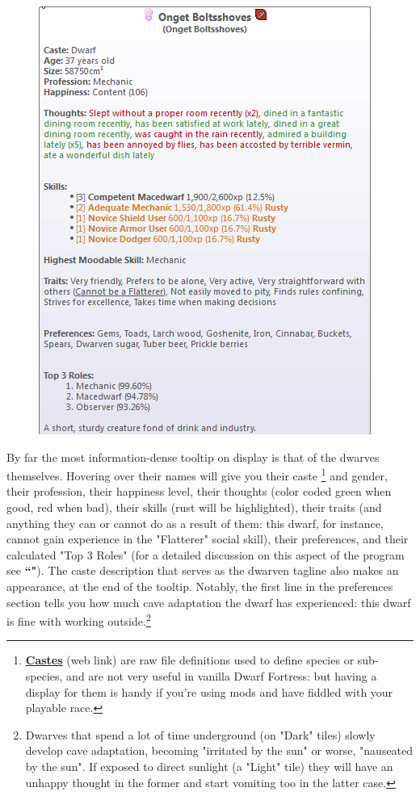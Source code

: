 \documentclass[]{article}
\begin{document}
\begin{figure}[h!]
\centering
\includegraphics{Sec1Fig8}
\end{figure}

By far the most information-dense tooltip on display is that of the dwarves themselves. Hovering over
their names will give you their caste
\footnote{\href{http://dwarffortresswiki.org/index.php/DF2012:Caste}{\textbf{Castes}} (web link) are raw
file definitions used to define species or sub-species, and are not very useful in vanilla Dwarf
Fortress: but having a display for them is handy if you're using mods and have fiddled with your playable
race.} and gender, their profession, their happiness level, their thoughts (color coded green when good,
red when bad), their skills (rust will be highlighted), their traits (and anything they can or cannot do
as a result of them: this dwarf, for instance, cannot gain experience in the "Flatterer" social skill),
their preferences, and their calculated "Top 3 Roles" (for a detailed discussion
on this aspect of the program see \textbf{``"}). The caste description that serves as
the dwarven tagline also makes an appearance, at the end of the tooltip.
Notably, the first line in the preferences section tells you how much cave adaptation the dwarf has
experienced: this dwarf is fine with working outside.\footnote{Dwarves that spend a lot of time
underground (on "Dark" tiles) slowly develop cave adaptation, becoming "irritated by the sun" or worse,
"nauseated by the sun". If exposed to direct sunlight (a "Light" tile) they will have an unhappy thought
in the former and start vomiting too in the latter case.}
\end{document}
